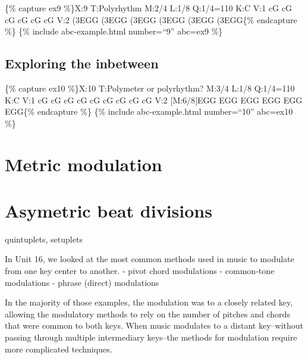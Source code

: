 \documentclass{book}
\begin{document}
\{\% capture ex9 \%\}X:9 T:Polyrhythm M:2/4 L:1/8 Q:1/4=110 K:C V:1 cG
cG\textbar{} cG cG\textbar{} cG cG\textbar{]} V:2 (3EGG (3EGG\textbar{} (3EGG
(3EGG\textbar{} (3EGG (3EGG\textbar{]}\{\% endcapture \%\} \{\% include
abc-example.html number=``9'' abc=ex9 \%\}

\hypertarget{exploring-the-inbetween}{%
\subsection{Exploring the inbetween}\label{exploring-the-inbetween}}

\{\% capture ex10 \%\}X:10 T:Polymeter or polyrhythm? M:3/4 L:1/8 Q:1/4=110
K:C V:1 cG cG cG\textbar{} cG cG cG\textbar{} cG cG cG\textbar{]} V:2
{[}M:6/8{]}EGG EGG\textbar{} EGG EGG\textbar{} EGG EGG\textbar{]}\{\%
endcapture \%\} \{\% include abc-example.html number=``10'' abc=ex10 \%\}

\hypertarget{metric-modulation}{%
\section{Metric modulation}\label{metric-modulation}}

\hypertarget{asymetric-beat-divisions}{%
\section{Asymetric beat divisions}\label{asymetric-beat-divisions}}

quintuplets, setuplets

In Unit 16, we looked at the most common methods used in music to modulate
from one key center to another. - pivot chord modulations - common-tone
modulations - phrase (direct) modulations

In the majority of those examples, the modulation was to a closely related
key, allowing the modulatory methods to rely on the number of pitches and
chords that were common to both keys. When music modulates to a distant
key--without passing through multiple intermediary keys--the methods for
modulation require more complicated techniques.
\end{document}
